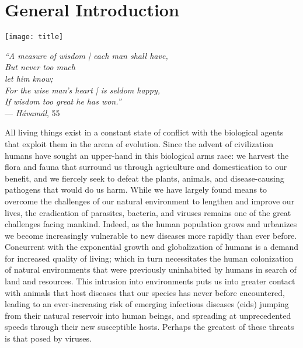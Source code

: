 \chapter{General Introduction}\label{ch:introduction}

\begin{minipage}[b]{0.6\textwidth}
  \texttt{[image: title]} %
\end{minipage}
\hfill
\begin{minipage}[b]{0.35\textwidth}
  \begin{flushright}
    \footnotesize
    \textit{``A measure of wisdom | each man shall have,\\
    But never too much\\let him know;\\
    For the wise man's heart | is seldom happy,\\
    If wisdom too great he has won.''} \\
    --- \textit{H\'avam\'al}, 55 
  \end{flushright}
  \vspace{2cm}
\end{minipage}

\clearpage

\onehalfspacing

All living things exist in a constant state of conflict with the biological agents that exploit them in the arena of evolution.
Since the advent of civilization humans have sought an upper-hand in this biological arms race: we harvest the flora and fauna that surround us through agriculture and domestication to our benefit, and we fiercely seek to defeat the plants, animals, and disease-causing pathogens that would do us harm.
While we have largely found means to overcome the challenges of our natural environment to lengthen and improve our lives, the eradication of parasites, bacteria, and viruses remains one of the great challenges facing mankind.
Indeed, as the human population grows and urbanizes we become increasingly vulnerable to new diseases more rapidly than ever before.
Concurrent with the exponential growth and globalization of humans is a demand for increased quality of living; which in turn necessitates the human colonization of natural environments that were previously uninhabited by humans in search of land and resources.
This intrusion into environments puts us into greater contact with animals that host diseases that our species has never before encountered, leading to an ever-increasing risk of emerging infectious diseases (\gls{eid}s) jumping from their natural reservoir into human beings, and spreading at unprecedented speeds through their new susceptible hosts.
Perhaps the greatest of these threats is that posed by viruses.\\

